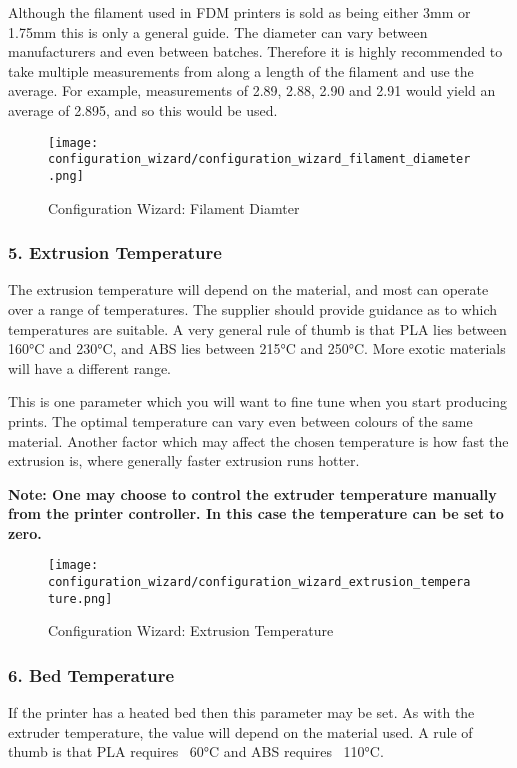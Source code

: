 Although the filament used in FDM printers is sold as being either 3mm or 1.75mm this is only a general guide.  The diameter can vary between manufacturers and even between batches.  Therefore it is highly recommended to take multiple measurements from along a length of the filament and use the average.  For example, measurements of 2.89, 2.88, 2.90 and 2.91 would yield an average of 2.895, and so this would be used.

\begin{figure}[H]
\centering
\texttt{[image: configuration\_wizard/configuration\_wizard\_filament\_diameter.png]}
\caption{Configuration Wizard: Filament Diamter}
\label{fig:configuration_wizard_filament_diameter}
\end{figure}

\newpage
\subsubsection{5. Extrusion Temperature}
\label{sub:5_extrusion_temperature}
The extrusion temperature will depend on the material, and most can operate over a range of temperatures.  The supplier should provide guidance as to which temperatures are suitable.  A very general rule of thumb is that PLA lies between 160°C and 230°C, and ABS lies between 215°C and 250°C.  More exotic materials will have a different range.

This is one parameter which you will want to fine tune when you start producing prints.  The optimal temperature can vary even between colours of the same material.  Another factor which may affect the chosen temperature is how fast the extrusion is, where generally faster extrusion runs hotter.

\textbf{Note: One may choose to control the extruder temperature manually from the printer controller. In this case the temperature can be set to zero.}

\begin{figure}[H]
\centering
\texttt{[image: configuration\_wizard/configuration\_wizard\_extrusion\_temperature.png]}
\caption{Configuration Wizard: Extrusion Temperature}
\label{fig:configuration_wizard_extrusion_temperature}
\end{figure}

\newpage
\subsubsection{6. Bed Temperature}
\label{sub:6_bed_temperature}
If the printer has a heated bed then this parameter may be set.  As with the extruder temperature, the value will depend on the material used.  A rule of thumb is that PLA requires ~60°C and ABS requires ~110°C.

